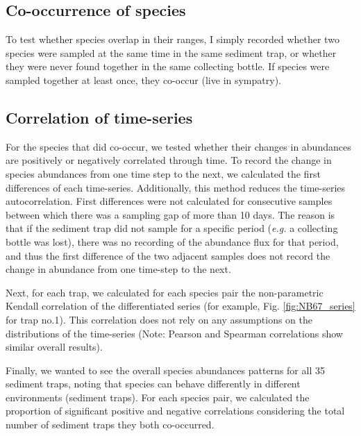 \documentclass[a4paper]{article}
\begin{document}
\subsection{Co-occurrence of species}

To test whether species overlap in their ranges, I simply recorded whether two species were sampled at the same time in the same sediment trap, or whether they were never found together in the same collecting bottle. If species were sampled together at least once, they co-occur (live in sympatry). 

\subsection{Correlation of time-series}

For the species that did co-occur, we tested whether their changes in abundances are positively or negatively correlated through time. To record the change in species abundances from one time step to the next, we calculated the first differences of each time-series. Additionally, this method reduces the time-series autocorrelation. %
First differences were not calculated for consecutive samples between which there was a sampling gap of more than 10 days. The reason is that if the sediment trap did not sample for a specific period (\textit{e.g.} a collecting bottle was lost), there was no recording of the abundance flux for that period, and thus the first difference of the two adjacent samples does not record the change in abundance from one time-step to the next.

Next, for each trap, we calculated for each species pair the non-parametric Kendall correlation of the differentiated series (for example, Fig. \ref{fig:NB67_series} for trap no.1). This correlation does not rely on any assumptions on the distributions of the time-series (Note: Pearson and Spearman correlations show similar overall results). 

Finally, we wanted to see the overall species abundances patterns for all 35 sediment traps, noting that species can behave differently in different environments (sediment traps). For each species pair, we calculated the proportion of significant positive and negative correlations considering the total number of sediment traps they both co-occurred.
\end{document}
